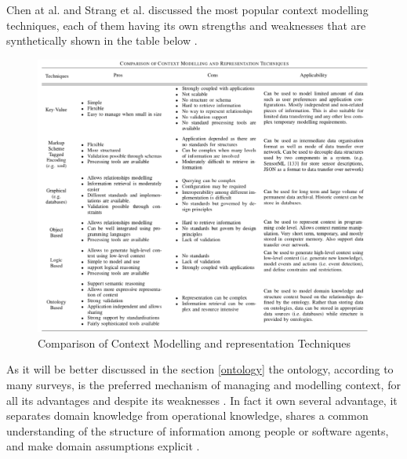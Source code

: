 \documentclass{thesisreport}
\begin{document}
 Chen at al. \cite{chen2000survey} and Strang et al. \cite{strang2004context} discussed the most popular context modelling techniques, each of them having its own strengths and weaknesses that are synthetically shown in the table below \cite{perera2014context}.
 
 	\begin{figure}[H]
		\centering
		\includegraphics[width=17.5cm]{Thesis/data/ContextModelComparison.png}
		\caption{Comparison of Context Modelling and representation Techniques \cite{perera2014context}}
		\label{fig:populationProspect}
	\end{figure}
 As it will be better discussed in the section \ref{ontology} the ontology, according to many surveys, is the preferred mechanism of managing and  modelling context, for all its advantages and despite its weaknesses \cite{perera2014context}.
 In fact it own several advantage, it separates domain knowledge from operational knowledge, shares a common understanding of the structure of information among people or software agents, and make domain assumptions explicit \cite{perera2014context}.
 
 
\end{document}
